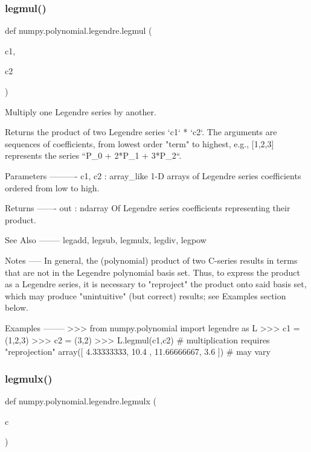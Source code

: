 \subsubsection{\texorpdfstring{legmul()}{legmul()}}
{\footnotesize\ttfamily def numpy.\+polynomial.\+legendre.\+legmul (\begin{DoxyParamCaption}\item[{}]{c1,  }\item[{}]{c2 }\end{DoxyParamCaption})}

\begin{DoxyVerb}Multiply one Legendre series by another.

Returns the product of two Legendre series `c1` * `c2`.  The arguments
are sequences of coefficients, from lowest order "term" to highest,
e.g., [1,2,3] represents the series ``P_0 + 2*P_1 + 3*P_2``.

Parameters
----------
c1, c2 : array_like
    1-D arrays of Legendre series coefficients ordered from low to
    high.

Returns
-------
out : ndarray
    Of Legendre series coefficients representing their product.

See Also
--------
legadd, legsub, legmulx, legdiv, legpow

Notes
-----
In general, the (polynomial) product of two C-series results in terms
that are not in the Legendre polynomial basis set.  Thus, to express
the product as a Legendre series, it is necessary to "reproject" the
product onto said basis set, which may produce "unintuitive" (but
correct) results; see Examples section below.

Examples
--------
>>> from numpy.polynomial import legendre as L
>>> c1 = (1,2,3)
>>> c2 = (3,2)
>>> L.legmul(c1,c2) # multiplication requires "reprojection"
array([  4.33333333,  10.4       ,  11.66666667,   3.6       ]) # may vary\end{DoxyVerb}
 \mbox{\label{namespacenumpy_1_1polynomial_1_1legendre_a2984b2d596308fda9790e1a276447a61}} 
\subsubsection{\texorpdfstring{legmulx()}{legmulx()}}
{\footnotesize\ttfamily def numpy.\+polynomial.\+legendre.\+legmulx (\begin{DoxyParamCaption}\item[{}]{c }\end{DoxyParamCaption})}


